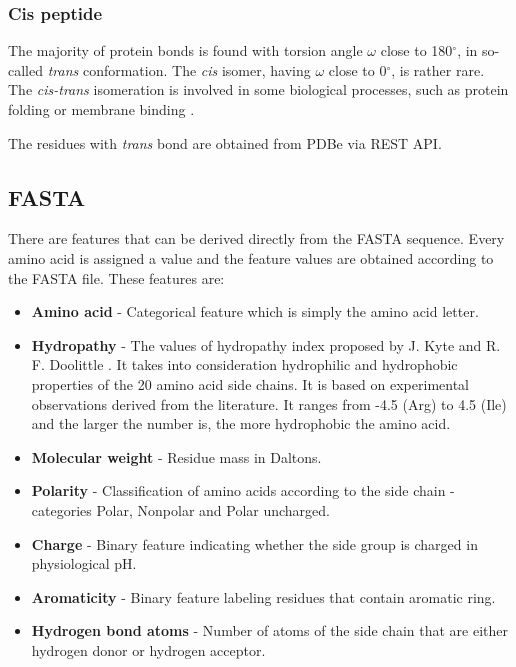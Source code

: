\subsubsection{Cis peptide}

The majority of protein bonds is found with torsion angle $\omega$ close to 180$^\circ$, in so-called \textit{trans} conformation. The \textit{cis} isomer, having $\omega$ close to 0$^\circ$, is rather rare. The \textit{cis-trans} isomeration is involved in some biological processes, such as protein folding or membrane binding \cite{cispeptide}.

The residues with \textit{trans} bond are obtained from PDBe via REST API.


\subsection{FASTA}

There are features that can be derived directly from the FASTA sequence. Every amino acid is assigned a value and the feature values are obtained according to the FASTA file. These features are:

\begin{itemize}
\item \textbf{Amino acid} - Categorical feature which is simply the amino acid letter.
\item \textbf{Hydropathy} - The values of hydropathy index proposed by J. Kyte and R. F. Doolittle \cite{kyte}. It takes into consideration hydrophilic and hydrophobic properties of the 20 amino acid side chains. It is based on experimental observations derived from the literature. It ranges from -4.5 (Arg) to 4.5 (Ile) and the larger the number is, the more hydrophobic the amino acid.
\item \textbf{Molecular weight} - Residue mass in Daltons.
\item \textbf{Polarity} - Classification of amino acids according to the side chain - categories Polar, Nonpolar and Polar uncharged.
\item \textbf{Charge} - Binary feature indicating whether the side group is charged in physiological pH.
\item \textbf{Aromaticity} - Binary feature labeling residues that contain aromatic ring.
\item \textbf{Hydrogen bond atoms} - Number of atoms of the side chain that are either hydrogen donor or hydrogen acceptor.
\end{itemize}

